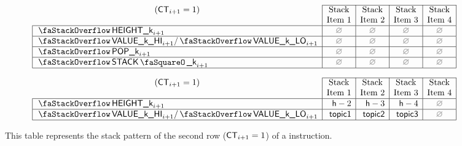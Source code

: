 \begin{figure}[h!]
\[
	\begin{array}{|l|c|c|c|c|} \cline{2-5}
	\multicolumn{1}{c|}{(\ct_{i + 1} = 1)}                     & \multicolumn{1}{c|}{\text{Stack}}  & \multicolumn{1}{c|}{\text{Stack}}  & \multicolumn{1}{c|}{\text{Stack}}  & \multicolumn{1}{c|}{\text{Stack}} \\
	\multicolumn{1}{c|}{}                                      & \multicolumn{1}{c|}{\text{Item 1}} & \multicolumn{1}{c|}{\text{Item 2}} & \multicolumn{1}{c|}{\text{Item 3}} & \multicolumn{1}{c|}{\text{Item 4}} \\ \hline
	\stackItemHeight{k}_{i + 1}                                & \nothing                           & \nothing                           & \nothing                           & \nothing \\ \hline 
	\stackItemValHi{k}_{i + 1} / \stackItemValLo{k}_{i + 1}    & \nothing                           & \nothing                           & \nothing                           & \nothing \\ \hline
	\stackItemPop{k}_{i + 1}                                   & \nothing                           & \nothing                           & \nothing                           & \nothing \\ \hline
	\stackItemStamp{k}_{i + 1}                                 & \nothing                           & \nothing                           & \nothing                           & \nothing \\ \hline
	\end{array}
\]
\caption{%
This table represents the stack pattern of the second row ($\textsf{CT}_{i + 1} = 1$) of a  instruction.}
\[
	\begin{array}{|l|r|r|r|c|} \cline{2-5}
	\multicolumn{1}{c|}{(\ct_{i + 1} = 1)}                  & \multicolumn{1}{c|}{\text{Stack}}  & \multicolumn{1}{c|}{\text{Stack}}  & \multicolumn{1}{c|}{\text{Stack}}  & \multicolumn{1}{c|}{\text{Stack}}  \\
	\multicolumn{1}{c|}{}                                   & \multicolumn{1}{c|}{\text{Item 1}} & \multicolumn{1}{c|}{\text{Item 2}} & \multicolumn{1}{c|}{\text{Item 3}} & \multicolumn{1}{c|}{\text{Item 4}} \\ \hline
	\stackItemHeight{k}_{i + 1}                             & \col{h} - 2                        & \col{h} - 3                        & \col{h} - 4                        & \nothing                           \\ \hline 
	\stackItemValHi{k}_{i + 1} / \stackItemValLo{k}_{i + 1} & \col{topic1}                       & \col{topic2}                       & \col{topic3}                       & \nothing                           \\ \hline

\end{array}\]
\end{figure}

